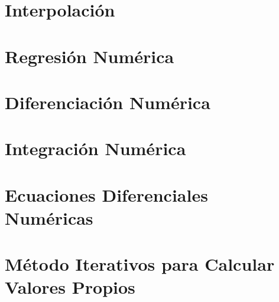 \documentclass[12pt]{article}
\begin{document}
\section{Interpolación}

\section{Regresión Numérica}

\section{Diferenciación Numérica}

\section{Integración Numérica}

\section{Ecuaciones Diferenciales Numéricas}

\section{Método Iterativos para Calcular Valores Propios}

\fi
\end{document}
